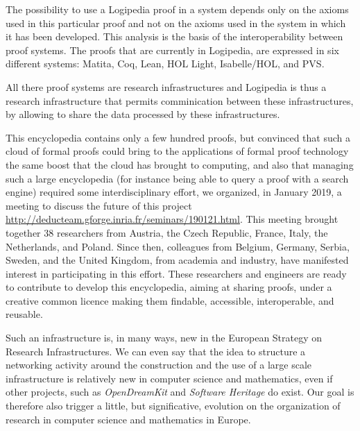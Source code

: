 The possibility to use a {\sf Logipedia} proof in a system depends
only on the axioms used in this particular proof and not on the axioms
used in the system in which it has been developed. This analysis is
the basis of the interoperability between proof systems.  The proofs
that are currently in {\sf Logipedia}, are expressed in six different
systems: {\sf Matita}, {\sf Coq}, {\sf Lean}, {\sf HOL Light}, {\sf
  Isabelle/HOL}, and {\sf PVS}.

All there proof systems are research infrastructures and {\sf
  Logipedia} is thus a research infrastructure that permits
comminication between these infrastructures, by allowing to share 
the data processed by these infrastructures.


This encyclopedia contains only a few hundred proofs, but convinced
that such a cloud of formal proofs could bring to the applications of
formal proof technology the same boost that the cloud has brought to
computing, and also that managing such a large encyclopedia (for
instance being able to query a proof with a search engine) required
some interdisciplinary effort, we organized, in January 2019, a
meeting to discuss the future of this project
\url{http://deducteam.gforge.inria.fr/seminars/190121.html}.  This
meeting brought together 38 researchers from Austria, the Czech
Republic, France, Italy, the Netherlands, and Poland.  Since then,
colleagues from Belgium, Germany, Serbia, Sweden, and the United
Kingdom, from academia and industry, have manifested interest in
participating in this effort.  These researchers and engineers are
ready to contribute to develop this encyclopedia, aiming at sharing
proofs, under a creative common licence making them findable,
accessible, interoperable, and reusable.

Such an infrastructure is, in many ways, new in the European Strategy
on Research Infrastructures. We can even say that the idea to
structure a networking activity around the construction and the use
of a large scale infrastructure is relatively new in computer science and
mathematics, even if other projects, such as {\em OpenDreamKit} and
{\em Software Heritage} do exist. Our goal is therefore also trigger a
little, but significative, evolution on the organization of research
in computer science and mathematics in Europe.

